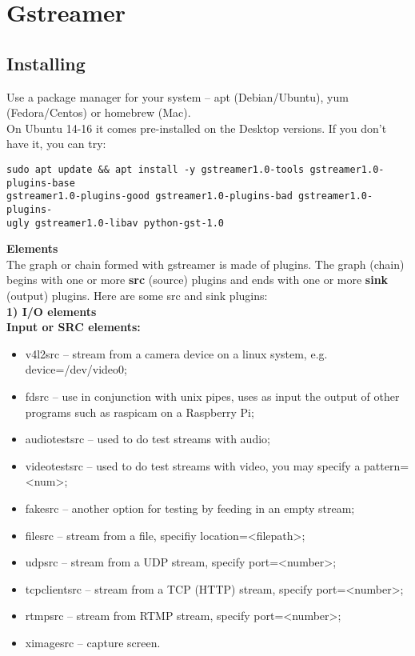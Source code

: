 \newpage
\section{Gstreamer}

\subsection{Installing}

Use a package manager for your system – apt (Debian/Ubuntu), yum (Fedora/Centos) or homebrew (Mac).
\\


On Ubuntu 14-16 it comes pre-installed on the Desktop versions. If you don’t have it, you can try:
\begin{verbatim}sudo apt update && apt install -y gstreamer1.0-tools gstreamer1.0-plugins-base 
gstreamer1.0-plugins-good gstreamer1.0-plugins-bad gstreamer1.0-plugins-
ugly gstreamer1.0-libav python-gst-1.0\end{verbatim}


\textbf{Elements}\\
The graph or chain formed with gstreamer is made of plugins. The graph (chain) begins with one or more \textbf{src} (source) plugins and ends with one or more \textbf{sink} (output) plugins. Here are some src and sink plugins:
\\

\textbf{ 1) I/O elements}\\

\textbf{ Input or SRC elements:}\\
\begin{itemize}
\item v4l2src – stream from a camera device on a linux system, e.g. device=/dev/video0;
\item fdsrc – use in conjunction with unix pipes, uses as input the output of other programs such as raspicam on a Raspberry Pi;
\item audiotestsrc – used to do test streams with audio;
\item videotestsrc – used to do test streams with video, you may specify a pattern=<num>;
\item fakesrc – another option for testing by feeding in an empty stream;
\item filesrc – stream from a file, specifiy location=<filepath>;
\item udpsrc – stream from a UDP stream, specify port=<number>;
\item tcpclientsrc – stream from a TCP (HTTP) stream, specify port=<number>;
\item rtmpsrc – stream from RTMP stream, specify port=<number>;
\item ximagesrc – capture screen.
\end{itemize}


